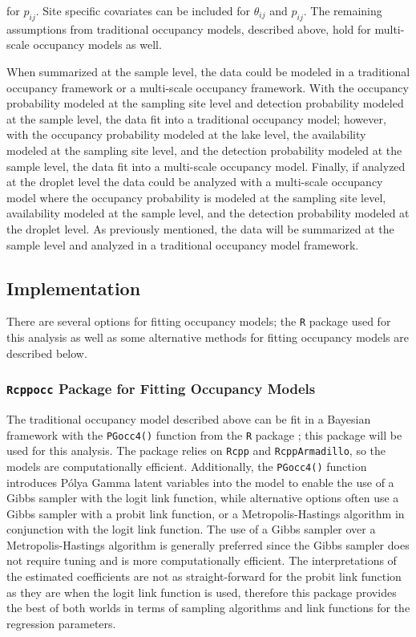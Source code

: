 \documentclass[12pt]{article}\usepackage[]{graphicx}\usepackage[]{color}
\begin{document}
for $p_{ij}$. Site specific covariates can be included for $\theta_{ij}$ and $p_{ij}$. The remaining assumptions from traditional occupancy models, described above, hold for multi-scale occupancy models as well.  

When summarized at the sample level, the data could be modeled in a traditional occupancy framework or a multi-scale occupancy framework. With the occupancy probability modeled at the sampling site level and detection probability modeled at the sample level, the data fit into a traditional occupancy model; however, with the occupancy probability modeled at the lake level, the availability modeled at the sampling site level, and the detection probability modeled at the sample level, the data fit into a multi-scale occupancy model. Finally, if analyzed at the droplet level the data could be analyzed with a multi-scale occupancy model where the occupancy probability is modeled at the sampling site level, availability modeled at the sample level, and the detection probability modeled at the droplet level. As previously mentioned, the data will be summarized at the sample level and analyzed in a traditional occupancy model framework. 

\subsection{Implementation}

There are several options for fitting occupancy models; the \texttt{R} package used for this analysis as well as some alternative methods for fitting occupancy models are described below. 

\subsubsection{\texttt{Rcppocc} Package for Fitting Occupancy Models}

The traditional occupancy model described above can be fit in a Bayesian framework with the \texttt{PGocc4()} function from the \texttt{R} package  \cite{Rcppocc}; this package will be used for this analysis. The package relies on \texttt{Rcpp} and \texttt{RcppArmadillo}, so the models are computationally efficient. Additionally, the \texttt{PGocc4()} function introduces P\'{o}lya Gamma latent variables into the model to enable the use of a Gibbs sampler with the logit link function, while alternative options often use a Gibbs sampler with a probit link function, or a Metropolis-Hastings algorithm in conjunction with the logit link function. The use of a Gibbs sampler over a Metropolis-Hastings algorithm is generally preferred since the Gibbs sampler does not require tuning and is more computationally efficient. The interpretations of the estimated coefficients are not as straight-forward for the probit link function as they are when the logit link function is used, therefore this package provides the best of both worlds in terms of sampling algorithms and link functions for the regression parameters.  
\end{document}
